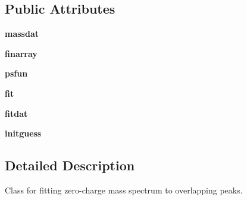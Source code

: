 \subsection*{Public Attributes}
\begin{DoxyCompactItemize}
\item 
\hypertarget{class_uni_dec_1_1unidec__modules_1_1_mass_fitter_1_1_mass_fitter_ab746838fc37f1410454ff30ef13af877}{}{\bfseries massdat}\label{class_uni_dec_1_1unidec__modules_1_1_mass_fitter_1_1_mass_fitter_ab746838fc37f1410454ff30ef13af877}

\item 
\hypertarget{class_uni_dec_1_1unidec__modules_1_1_mass_fitter_1_1_mass_fitter_abdb7104832b5aa6721fd4ec3569bc3df}{}{\bfseries finarray}\label{class_uni_dec_1_1unidec__modules_1_1_mass_fitter_1_1_mass_fitter_abdb7104832b5aa6721fd4ec3569bc3df}

\item 
\hypertarget{class_uni_dec_1_1unidec__modules_1_1_mass_fitter_1_1_mass_fitter_ad57b1b5e2d1d395762b08ec71887bb14}{}{\bfseries psfun}\label{class_uni_dec_1_1unidec__modules_1_1_mass_fitter_1_1_mass_fitter_ad57b1b5e2d1d395762b08ec71887bb14}

\item 
\hypertarget{class_uni_dec_1_1unidec__modules_1_1_mass_fitter_1_1_mass_fitter_a3d89617bda436392b85fcfb041fd4fc7}{}{\bfseries fit}\label{class_uni_dec_1_1unidec__modules_1_1_mass_fitter_1_1_mass_fitter_a3d89617bda436392b85fcfb041fd4fc7}

\item 
\hypertarget{class_uni_dec_1_1unidec__modules_1_1_mass_fitter_1_1_mass_fitter_aa46bc370fb270615b3d4c20bf758b6ea}{}{\bfseries fitdat}\label{class_uni_dec_1_1unidec__modules_1_1_mass_fitter_1_1_mass_fitter_aa46bc370fb270615b3d4c20bf758b6ea}

\item 
\hypertarget{class_uni_dec_1_1unidec__modules_1_1_mass_fitter_1_1_mass_fitter_aa5570edcf6d1e58ee895c795885e45ab}{}{\bfseries initguess}\label{class_uni_dec_1_1unidec__modules_1_1_mass_fitter_1_1_mass_fitter_aa5570edcf6d1e58ee895c795885e45ab}

\end{DoxyCompactItemize}


\subsection{Detailed Description}
\begin{DoxyVerb}Class for fitting zero-charge mass spectrum to overlapping peaks.
\end{DoxyVerb}
 

